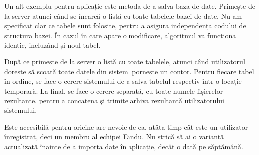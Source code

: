 	Un alt exemplu pentru aplicație este metoda de a salva baza de date.
	Primește de la server atunci când se încarcă o listă cu toate tabelele bazei de date.
	Nu am specificat clar ce tabele sunt folosite, pentru a asigura independența codului de structura bazei.
	În cazul în care apare o modificare, algoritmul va funcționa identic, incluzând și noul tabel.

	După ce primește de la server o listă cu toate tabelele, atunci când utilizatorul dorește să scoată toate datele din sistem, pornește un contor.
	Pentru fiecare tabel în ordine, se face o cerere sistemului de a salva tabelul respectiv într-o locație temporară.
	La final, se face o cerere separată, cu toate numele fișierelor rezultante, pentru a concatena și trimite arhiva rezultantă utilizatorului sistemului.

	Este accesibilă pentru oricine are nevoie de ea, atâta timp cât este un utilizator înregistrat, deci un membru al echipei Fandu.
	Nu strică să ai o variantă actualizată înainte de a importa date în aplicație, decât o dată pe săptămână.
